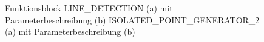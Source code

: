 \documentclass[ngerman,12pt]{article} %
\begin{document}
{\begin{figure}[h!tb]
  \centering
  \qquad
  \caption[Funktionsblock  LINE\_DETECTION mit Parameterbeschreibung]{\label{pic:LINE_DETECTION} Funktionsblock LINE\_DETECTION (a) mit Parameterbeschreibung (b) ISOLATED\_POINT\_GENERATOR\_2 (a) mit Parameterbeschreibung (b)}
\end{figure}

}
\end{document}
